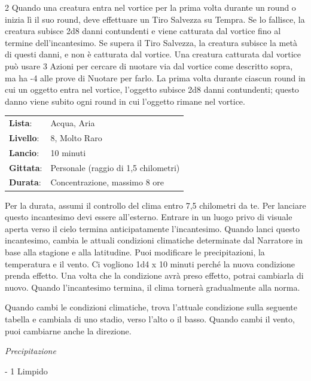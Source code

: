 \begin{multicols}{2}
Quando una creatura entra nel vortice per la prima volta durante un round o inizia lì il suo round, deve effettuare un Tiro Salvezza su Tempra. Se lo fallisce, la creatura subisce 2d8 danni contundenti e viene catturata dal vortice fino al termine dell'incantesimo. Se supera il Tiro Salvezza, la creatura subisce la metà di questi danni, e non è catturata dal vortice. Una creatura catturata dal vortice può usare 3 Azioni per cercare di nuotare via dal vortice come descritto sopra, ma ha -4 alle prove di Nuotare per farlo. La prima volta durante ciascun round in cui un oggetto entra nel vortice, l'oggetto subisce 2d8 danni contundenti; questo danno viene subito ogni round in cui l'oggetto rimane nel vortice.

\noindent\begin{tabularx}{\linewidth}{p{1.9cm}X}
	\rowcolor{gray!20}\textbf{Lista}: & Acqua, Aria \\
	\textbf{Livello}: & 8, Molto Raro \\
	\rowcolor{gray!20}\textbf{Lancio}: & 10 minuti \\
	\textbf{Gittata}: & Personale (raggio di 1,5 chilometri) \\
	\rowcolor{gray!20}\textbf{Durata}: & Concentrazione, massimo 8 ore \\
\end{tabularx}\smallskip

Per la durata, assumi il controllo del clima entro 7,5 chilometri da te. Per lanciare questo incantesimo devi essere all'esterno. Entrare in un luogo privo di visuale aperta verso il cielo termina anticipatamente l'incantesimo. Quando lanci questo incantesimo, cambia le attuali condizioni climatiche determinate dal Narratore in base alla stagione e alla latitudine. Puoi modificare le precipitazioni, la temperatura e il vento. Ci vogliono 1d4 x 10 minuti perché la nuova condizione prenda effetto. Una volta che la condizione avrà preso effetto, potrai cambiarla di nuovo. Quando l'incantesimo termina, il clima tornerà gradualmente alla norma.

\medskip

Quando cambi le condizioni climatiche, trova l'attuale condizione sulla seguente tabella e cambiala di uno stadio, verso l'alto o il basso. Quando cambi il vento, puoi cambiarne anche la direzione.

\medskip

\emph{Precipitazione}

- 1 Limpido


\end{multicols}
